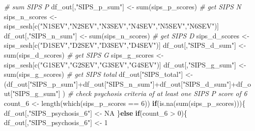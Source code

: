 \documentclass[
]{article}
\newenvironment{Shaded}{\begin{snugshade}}{\end{snugshade}}
\newcommand{\CommentTok}[1]{\textcolor[rgb]{0.56,0.35,0.01}{\textit{#1}}}
\newcommand{\ConstantTok}[1]{\textcolor[rgb]{0.00,0.00,0.00}{#1}}
\newcommand{\ControlFlowTok}[1]{\textcolor[rgb]{0.13,0.29,0.53}{\textbf{#1}}}
\newcommand{\DecValTok}[1]{\textcolor[rgb]{0.00,0.00,0.81}{#1}}
\newcommand{\FunctionTok}[1]{\textcolor[rgb]{0.00,0.00,0.00}{#1}}
\newcommand{\NormalTok}[1]{#1}
\newcommand{\OtherTok}[1]{\textcolor[rgb]{0.56,0.35,0.01}{#1}}
\newcommand{\SpecialCharTok}[1]{\textcolor[rgb]{0.00,0.00,0.00}{#1}}
\newcommand{\StringTok}[1]{\textcolor[rgb]{0.31,0.60,0.02}{#1}}
\begin{document}
\begin{Shaded}
\begin{Highlighting}[]
     \CommentTok{\# sum SIPS P}
\NormalTok{     df\_out[,}\StringTok{"SIPS\_p\_sum"}\NormalTok{] }\OtherTok{\textless{}{-}} \FunctionTok{sum}\NormalTok{(sips\_p\_scores)}
     \CommentTok{\# get SIPS N}
\NormalTok{     sips\_n\_scores }\OtherTok{\textless{}{-}}\NormalTok{ sips\_sesh[}\FunctionTok{c}\NormalTok{(}\StringTok{"N1SEV"}\NormalTok{,}\StringTok{"N2SEV"}\NormalTok{,}\StringTok{"N3SEV"}\NormalTok{,}\StringTok{"N4SEV"}\NormalTok{,}\StringTok{"N5SEV"}\NormalTok{,}\StringTok{"N6SEV"}\NormalTok{)]}
\NormalTok{     df\_out[,}\StringTok{"SIPS\_n\_sum"}\NormalTok{] }\OtherTok{\textless{}{-}} \FunctionTok{sum}\NormalTok{(sips\_n\_scores)}
     \CommentTok{\# get SIPS D}
\NormalTok{     sips\_d\_scores }\OtherTok{\textless{}{-}}\NormalTok{ sips\_sesh[}\FunctionTok{c}\NormalTok{(}\StringTok{"D1SEV"}\NormalTok{,}\StringTok{"D2SEV"}\NormalTok{,}\StringTok{"D3SEV"}\NormalTok{,}\StringTok{"D4SEV"}\NormalTok{)]}
\NormalTok{     df\_out[,}\StringTok{"SIPS\_d\_sum"}\NormalTok{] }\OtherTok{\textless{}{-}} \FunctionTok{sum}\NormalTok{(sips\_d\_scores)}
     \CommentTok{\# get SIPS G}
\NormalTok{     sips\_g\_scores }\OtherTok{\textless{}{-}}\NormalTok{ sips\_sesh[}\FunctionTok{c}\NormalTok{(}\StringTok{"G1SEV"}\NormalTok{,}\StringTok{"G2SEV"}\NormalTok{,}\StringTok{"G3SEV"}\NormalTok{,}\StringTok{"G4SEV"}\NormalTok{)]}
\NormalTok{     df\_out[,}\StringTok{"SIPS\_g\_sum"}\NormalTok{] }\OtherTok{\textless{}{-}} \FunctionTok{sum}\NormalTok{(sips\_g\_scores)}
     \CommentTok{\# get SIPS total}
\NormalTok{     df\_out[}\StringTok{"SIPS\_total"}\NormalTok{] }\OtherTok{\textless{}{-}}\NormalTok{ (df\_out[}\StringTok{"SIPS\_p\_sum"}\NormalTok{]}\SpecialCharTok{+}\NormalTok{df\_out[}\StringTok{"SIPS\_n\_sum"}\NormalTok{]}\SpecialCharTok{+}\NormalTok{df\_out[}\StringTok{"SIPS\_d\_sum"}\NormalTok{]}\SpecialCharTok{+}\NormalTok{df\_out[}\StringTok{"SIPS\_g\_sum"}\NormalTok{] )}
     \CommentTok{\# check psychosis criteria of at least one SIPS P score of 6}
\NormalTok{     count\_6 }\OtherTok{\textless{}{-}} \FunctionTok{length}\NormalTok{(}\FunctionTok{which}\NormalTok{(sips\_p\_scores }\SpecialCharTok{==} \DecValTok{6}\NormalTok{))}
     \ControlFlowTok{if}\NormalTok{(}\FunctionTok{is.na}\NormalTok{(}\FunctionTok{sum}\NormalTok{(sips\_p\_scores)))\{}
\NormalTok{       df\_out[,}\StringTok{"SIPS\_psychosis\_6"}\NormalTok{] }\OtherTok{\textless{}{-}} \ConstantTok{NA}
\NormalTok{     \}}\ControlFlowTok{else} \ControlFlowTok{if}\NormalTok{(count\_6 }\SpecialCharTok{\textgreater{}} \DecValTok{0}\NormalTok{)\{}
\NormalTok{       df\_out[,}\StringTok{"SIPS\_psychosis\_6"}\NormalTok{] }\OtherTok{\textless{}{-}} \DecValTok{1}

\end{Highlighting}
\end{Shaded}
\end{document}
